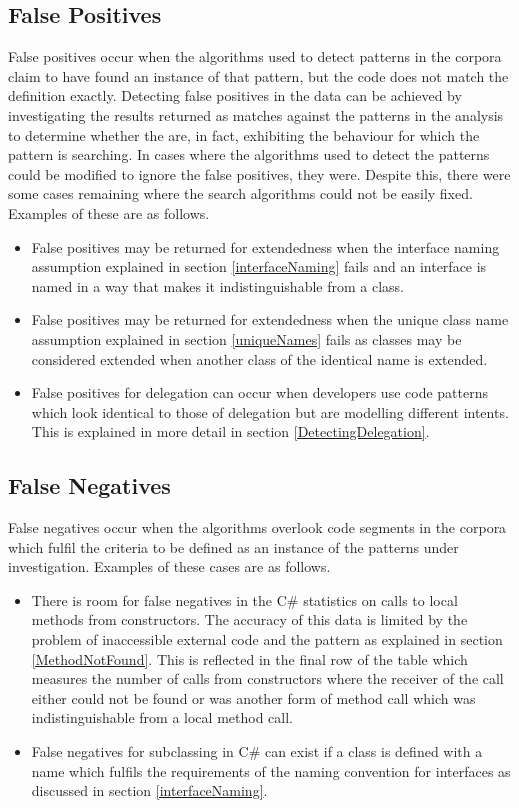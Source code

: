 \subsection{False Positives}
\label{falsePositives}
False positives occur when the algorithms used to detect patterns in the corpora claim to have found an instance of that pattern, but the code does not match the definition exactly. Detecting false positives in the data can be achieved by investigating the results returned as matches against the patterns in the analysis to determine whether the are, in fact, exhibiting the behaviour for which the pattern is searching. In cases where the algorithms used to detect the patterns could be modified to ignore the false positives, they were. Despite this, there were some cases remaining where the search algorithms could not be easily fixed. Examples of these are as follows.
\begin{itemize}
	\item False positives may be returned for extendedness when the interface naming assumption explained in section \ref{interfaceNaming} fails and an interface is named in a way that makes it indistinguishable from a class.
	\item False positives may be returned for extendedness when the unique class name assumption explained in section \ref{uniqueNames} fails as classes may be considered extended when another class of the identical name is extended.
	\item False positives for delegation can occur when developers use code patterns which look identical to those of delegation but are modelling different intents. This is explained in more detail in section \ref{DetectingDelegation}.
\end{itemize} 

\subsection{False Negatives}
False negatives occur when the algorithms overlook code segments in the corpora which fulfil the criteria to be defined as an instance of the patterns under investigation. Examples of these cases are as follows.
\begin{itemize}
	\item There is room for false negatives in the C\# statistics on calls to local methods from constructors. The accuracy of this data is limited by the problem of inaccessible external code and the  pattern as explained in section \ref{MethodNotFound}. This is reflected in the final row of the table which measures the number of calls from constructors where the receiver of the call either could not be found or was another form of method call which was indistinguishable from a local method call.
	\item False negatives for subclassing in C\# can exist if a class is defined with a name which fulfils the requirements of the naming convention for interfaces as discussed in section \ref{interfaceNaming}.
\end{itemize}





